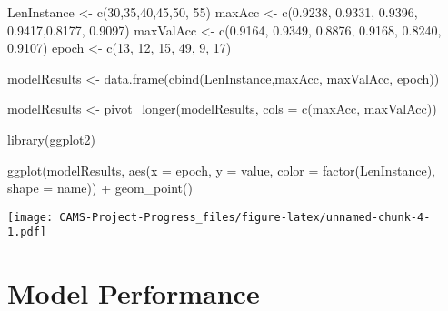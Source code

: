\documentclass[
]{book}
\newenvironment{Shaded}{\begin{snugshade}}{\end{snugshade}}
\newcommand{\AttributeTok}[1]{\textcolor[rgb]{0.77,0.63,0.00}{#1}}
\newcommand{\DecValTok}[1]{\textcolor[rgb]{0.00,0.00,0.81}{#1}}
\newcommand{\FloatTok}[1]{\textcolor[rgb]{0.00,0.00,0.81}{#1}}
\newcommand{\FunctionTok}[1]{\textcolor[rgb]{0.00,0.00,0.00}{#1}}
\newcommand{\NormalTok}[1]{#1}
\newcommand{\OtherTok}[1]{\textcolor[rgb]{0.56,0.35,0.01}{#1}}
\newcommand{\SpecialCharTok}[1]{\textcolor[rgb]{0.00,0.00,0.00}{#1}}
\begin{document}
\begin{Shaded}
\begin{Highlighting}[]
\NormalTok{LenInstance }\OtherTok{\textless{}{-}} \FunctionTok{c}\NormalTok{(}\DecValTok{30}\NormalTok{,}\DecValTok{35}\NormalTok{,}\DecValTok{40}\NormalTok{,}\DecValTok{45}\NormalTok{,}\DecValTok{50}\NormalTok{, }\DecValTok{55}\NormalTok{)}
\NormalTok{maxAcc }\OtherTok{\textless{}{-}} \FunctionTok{c}\NormalTok{(}\FloatTok{0.9238}\NormalTok{, }\FloatTok{0.9331}\NormalTok{, }\FloatTok{0.9396}\NormalTok{, }\FloatTok{0.9417}\NormalTok{,}\FloatTok{0.8177}\NormalTok{, }\FloatTok{0.9097}\NormalTok{)}
\NormalTok{maxValAcc }\OtherTok{\textless{}{-}} \FunctionTok{c}\NormalTok{(}\FloatTok{0.9164}\NormalTok{, }\FloatTok{0.9349}\NormalTok{, }\FloatTok{0.8876}\NormalTok{, }\FloatTok{0.9168}\NormalTok{, }\FloatTok{0.8240}\NormalTok{, }\FloatTok{0.9107}\NormalTok{)}
\NormalTok{epoch }\OtherTok{\textless{}{-}}  \FunctionTok{c}\NormalTok{(}\DecValTok{13}\NormalTok{, }\DecValTok{12}\NormalTok{, }\DecValTok{15}\NormalTok{, }\DecValTok{49}\NormalTok{, }\DecValTok{9}\NormalTok{, }\DecValTok{17}\NormalTok{)}

\NormalTok{modelResults }\OtherTok{\textless{}{-}} \FunctionTok{data.frame}\NormalTok{(}\FunctionTok{cbind}\NormalTok{(LenInstance,maxAcc, maxValAcc, epoch))}

\NormalTok{modelResults }\OtherTok{\textless{}{-}} \FunctionTok{pivot\_longer}\NormalTok{(modelResults, }\AttributeTok{cols =} \FunctionTok{c}\NormalTok{(maxAcc, maxValAcc))}
\end{Highlighting}
\end{Shaded}

\begin{Shaded}
\begin{Highlighting}[]
\FunctionTok{library}\NormalTok{(ggplot2)}

\FunctionTok{ggplot}\NormalTok{(modelResults, }\FunctionTok{aes}\NormalTok{(}\AttributeTok{x =}\NormalTok{ epoch, }\AttributeTok{y =}\NormalTok{ value, }\AttributeTok{color =} \FunctionTok{factor}\NormalTok{(LenInstance), }\AttributeTok{shape =}\NormalTok{ name)) }\SpecialCharTok{+} \FunctionTok{geom\_point}\NormalTok{()}
\end{Highlighting}
\end{Shaded}

\texttt{[image: CAMS-Project-Progress\_files/figure-latex/unnamed-chunk-4-1.pdf]}

\hypertarget{performance}{%
\chapter{Model Performance}\label{performance}}
\end{document}
